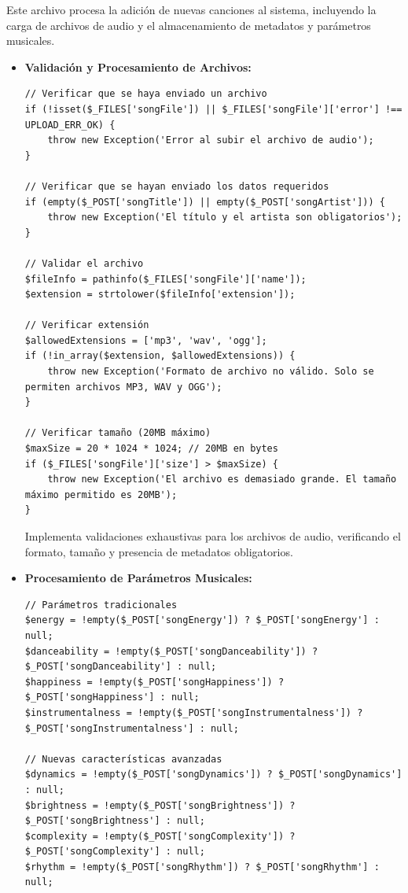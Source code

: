 \documentclass[a4paper,12pt]{article}
\begin{document}
Este archivo procesa la adición de nuevas canciones al sistema, incluyendo la carga de archivos de audio y el almacenamiento de metadatos y parámetros musicales.

\begin{itemize}
    \item \textbf{Validación y Procesamiento de Archivos:}
    \begin{verbatim}
// Verificar que se haya enviado un archivo
if (!isset($_FILES['songFile']) || $_FILES['songFile']['error'] !== UPLOAD_ERR_OK) {
    throw new Exception('Error al subir el archivo de audio');
}

// Verificar que se hayan enviado los datos requeridos
if (empty($_POST['songTitle']) || empty($_POST['songArtist'])) {
    throw new Exception('El título y el artista son obligatorios');
}

// Validar el archivo
$fileInfo = pathinfo($_FILES['songFile']['name']);
$extension = strtolower($fileInfo['extension']);

// Verificar extensión
$allowedExtensions = ['mp3', 'wav', 'ogg'];
if (!in_array($extension, $allowedExtensions)) {
    throw new Exception('Formato de archivo no válido. Solo se permiten archivos MP3, WAV y OGG');
}

// Verificar tamaño (20MB máximo)
$maxSize = 20 * 1024 * 1024; // 20MB en bytes
if ($_FILES['songFile']['size'] > $maxSize) {
    throw new Exception('El archivo es demasiado grande. El tamaño máximo permitido es 20MB');
}
    \end{verbatim}
    Implementa validaciones exhaustivas para los archivos de audio, verificando el formato, tamaño y presencia de metadatos obligatorios.
    
    \item \textbf{Procesamiento de Parámetros Musicales:}
    \begin{verbatim}
// Parámetros tradicionales
$energy = !empty($_POST['songEnergy']) ? $_POST['songEnergy'] : null;
$danceability = !empty($_POST['songDanceability']) ? $_POST['songDanceability'] : null;
$happiness = !empty($_POST['songHappiness']) ? $_POST['songHappiness'] : null;
$instrumentalness = !empty($_POST['songInstrumentalness']) ? $_POST['songInstrumentalness'] : null;

// Nuevas características avanzadas
$dynamics = !empty($_POST['songDynamics']) ? $_POST['songDynamics'] : null;
$brightness = !empty($_POST['songBrightness']) ? $_POST['songBrightness'] : null;
$complexity = !empty($_POST['songComplexity']) ? $_POST['songComplexity'] : null;
$rhythm = !empty($_POST['songRhythm']) ? $_POST['songRhythm'] : null;


\end{verbatim}
\end{itemize}
\end{document}
